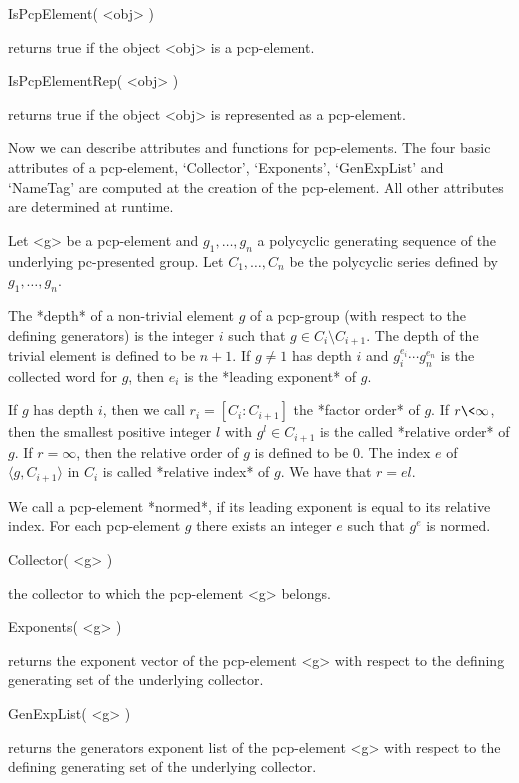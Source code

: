 \>IsPcpElement( <obj> )

returns true if the object <obj> is a pcp-element.

\>IsPcpElementRep( <obj> )

returns true if the object <obj> is represented as a pcp-element.


Now we can describe attributes and functions for pcp-elements. The
four basic attributes of a pcp-element, `Collector', `Exponents',
`GenExpList' and `NameTag' are computed at the creation of the
pcp-element. All other attributes are determined at runtime.

Let <g> be a pcp-element and $g_1, \ldots, g_n$ a polycyclic generating
sequence of the underlying pc-presented group. Let $C_1, \ldots, C_n$
be the polycyclic series defined by $g_1, \ldots, g_n$.

The *depth* of a non-trivial element $g$ of  a pcp-group (with respect 
to the defining generators) is the integer $i$ such that $g \in C_i  
\setminus C_{i+1}$. The depth  of the trivial element is defined to 
be $n+1$. If $g\not=1$ has depth $i$ and $g_i^{e_i} \cdots g_n^{e_n}$
is the collected word for $g$, then $e_i$ is the *leading exponent* of
$g$.

If  $g$ has  depth $i$, then we call $r_i = [C_i:C_{i+1}]$ the *factor
order* of $g$. If $r\<\infty$, then the  smallest positive integer $l$
with $g^l  \in C_{i+1}$  is the called  *relative  order* of  $g$.  If
$r=\infty$, then the relative order  of $g$ is defined  to be $0$. The
index $e$   of $\langle g,C_{i+1}\rangle$  in  $C_i$ is called *relative  
index*   of  $g$.   We   have that   $r  =  el$. 

We  call a pcp-element *normed*, if its leading  exponent is equal to
its relative index. For  each pcp-element $g$  there exists an integer
$e$  such   that $g^e$  is  normed.  

\bigskip

\> Collector( <g> )

the collector to  which the pcp-element  <g> belongs.

\>Exponents( <g> )

returns the exponent vector of the pcp-element <g> with respect to the defining
generating set of the underlying collector.

\>GenExpList( <g> )

returns the generators  exponent  list  of the  pcp-element  <g> with respect to 
the defining generating set of the underlying collector.

